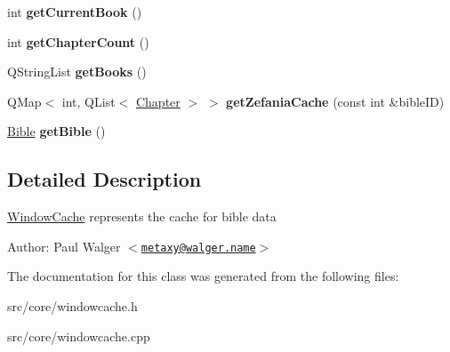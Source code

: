 \begin{CompactItemize}
\item 
\hypertarget{classWindowCache_40a736d1cbd24e1452c98a3cdd0041b0}{
int \textbf{getCurrentBook} ()}
\label{classWindowCache_40a736d1cbd24e1452c98a3cdd0041b0}

\item 
\hypertarget{classWindowCache_b097feda6b0e94ad055e2a91b1ec80d2}{
int \textbf{getChapterCount} ()}
\label{classWindowCache_b097feda6b0e94ad055e2a91b1ec80d2}

\item 
\hypertarget{classWindowCache_593b0ef814ce4b614be37b63d8ef5e31}{
QStringList \textbf{getBooks} ()}
\label{classWindowCache_593b0ef814ce4b614be37b63d8ef5e31}

\item 
\hypertarget{classWindowCache_c7d69389b84dc55771adcc89aa98a42e}{
QMap$<$ int, QList$<$ \hyperlink{structChapter}{Chapter} $>$ $>$ \textbf{getZefaniaCache} (const int \&bibleID)}
\label{classWindowCache_c7d69389b84dc55771adcc89aa98a42e}

\item 
\hypertarget{classWindowCache_de273ab129b581d4982140fc9b2762e1}{
\hyperlink{classBible}{Bible} \textbf{getBible} ()}
\label{classWindowCache_de273ab129b581d4982140fc9b2762e1}

\end{CompactItemize}


\subsection{Detailed Description}
\hyperlink{classWindowCache}{WindowCache} represents the cache for bible data

\begin{Desc}
\item[Author:]Paul Walger $<$\href{mailto:metaxy@walger.name}{\tt metaxy@walger.name}$>$ \end{Desc}


The documentation for this class was generated from the following files:\begin{CompactItemize}
\item 
src/core/windowcache.h\item 
src/core/windowcache.cpp\end{CompactItemize}
